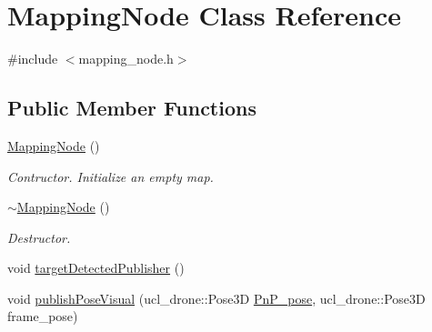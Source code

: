 \hypertarget{classMappingNode}{}\section{Mapping\+Node Class Reference}
\label{classMappingNode}


{\ttfamily \#include $<$mapping\+\_\+node.\+h$>$}

\subsection*{Public Member Functions}
\begin{DoxyCompactItemize}
\item 
\mbox{\label{classMappingNode_a6e55235771f4c40028563623b1ca87fa}} 
\hyperlink{classMappingNode_a6e55235771f4c40028563623b1ca87fa}{Mapping\+Node} ()
\begin{DoxyCompactList}\small\item\em Contructor. Initialize an empty map. \end{DoxyCompactList}\item 
\mbox{\label{classMappingNode_a50a65856eee4bd02fd3a09e145d1a976}} 
\hyperlink{classMappingNode_a50a65856eee4bd02fd3a09e145d1a976}{$\sim$\+Mapping\+Node} ()
\begin{DoxyCompactList}\small\item\em Destructor. \end{DoxyCompactList}\item 
void \hyperlink{classMappingNode_a2852fa151856879640e6425ebb56d112}{target\+Detected\+Publisher} ()
\item 
void \hyperlink{classMappingNode_a496131230fe880f4155bb8e0363014d6}{publish\+Pose\+Visual} (ucl\+\_\+drone\+::\+Pose3D \hyperlink{classMappingNode_a17b9d538c600192cabffacb62fba76b5}{Pn\+P\+\_\+pose}, ucl\+\_\+drone\+::\+Pose3D frame\+\_\+pose)
\end{DoxyCompactItemize}
